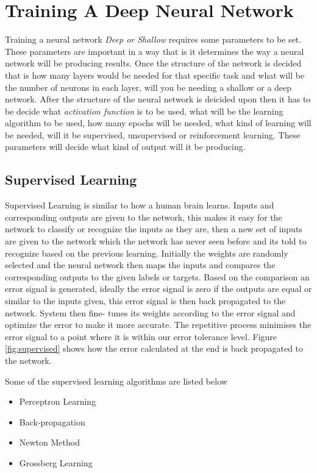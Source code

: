 \documentclass[12pt, a4paper]{report}
\begin{document}
\section{Training A Deep Neural Network}\label{train}

Training a neural network \textit{Deep or Shallow} requires some parameters to be set. These parameters are important in a way that is it determines the way a neural network will be producing results. Once the structure of the network is decided that is how many layers would be needed for that specific task and what will be the number of neurons in each layer, will you be needing a shallow or a deep network. After the structure of the neural network is deicided upon then it has to be decide what \textit{activation function} is to be used, what will be the learning algorithm to be used, how many epochs will be needed, what kind of learning will be needed, will it be supervised, unsupervised or reinforcement learning. These parameters will decide what kind of output will it be producing.\\ \par

\subsection{Supervised Learning}\label{sec:supervisedLearning}

Supervised Learning is similar to how a human brain learns. Inputs and corresponding outputs are given to the network, this makes it easy for the network to classify or recognize the inputs as they are, then a new set of inputs are given to the network which the network has never seen before and its told to recognize based on the previous learning. Initially the weights are randomly selected and the neural network then maps the inputs and compares the corresponding outputs to the given labels or targets. Based on the comparison an error signal is generated, ideally the error signal is zero if the outputs are equal or similar to the inputs given, this error signal is then back propagated to the network. System then fine- tunes its weights according to the error signal and optimize the error to make it more accurate. The repetitive process minimises the error signal to a point where it is within our error tolerance level. Figure \ref{fig:supervised} shows how the error calculated at the end is back propagated to the network.\\ \par
\clearpage
Some of the supervised learning algorithms are listed below
\begin{itemize}
	\item{Perceptron Learning}
	\item{Back-propagation}
	\item{Newton Method}
	\item{Grossberg Learning}
\end{itemize}
\end{document}

